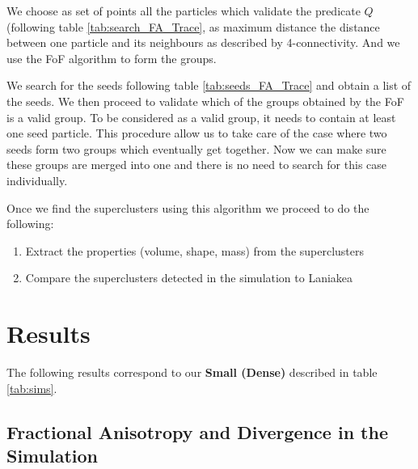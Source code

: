 \documentclass[12pt]{article}
\begin{document}
\begin{par}
We choose as set of points all the
particles which validate the predicate $Q$ (following table
\ref{tab:search_FA_Trace}, as maximum distance the distance
between one particle and its neighbours as described by
4-connectivity. And we use the FoF algorithm to form the groups. 
\end{par}
\begin{par}
We search for the seeds following table \ref{tab:seeds_FA_Trace}
and obtain a list of the seeds. We then proceed to validate which
of the groups obtained by the FoF is a valid group. To be
considered as a valid group, it needs to contain at least one seed
particle. This procedure allow us to take care of the case where
two seeds form two groups which eventually get together. Now we
can make sure these groups are merged into one and there is no
need to search for this case individually. \\
\end{par}

\begin{par}
Once we find the superclusters using this algorithm we proceed to do the following:
\end{par}
\begin{enumerate}
\item Extract the properties (volume, shape, mass) from the superclusters
\item Compare the superclusters detected in the simulation to Laniakea
\end{enumerate}





\section{Results}

The following results correspond to our
 \textbf{Small (Dense)} described in table
  \ref{tab:sims}.
  
\subsection{Fractional Anisotropy and Divergence in the Simulation}
\end{document}

